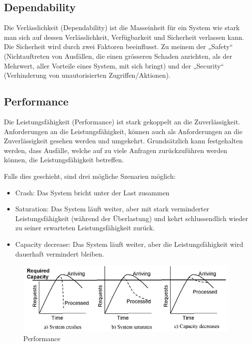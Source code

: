 \subsection{Dependability}

Die Verlässlichkeit (Dependability) ist die Masseinheit für ein System wie stark man sich auf dessen Verlässlichkeit, Verfügbarkeit und Sicherheit verlassen kann. Die Sicherheit wird durch zwei Faktoren beeinflusst. Zu meinem der „Safety“ (Nichtauftreten von Ausfällen, die einen grösseren Schaden anrichten, als der Mehrwert, aller Vorteile eines System, mit sich bringt) und der „Security“ (Verhinderung von unautorisierten Zugriffen/Aktionen).

\subsection{Performance}

Die Leistungsfähigkeit (Performance) ist stark gekoppelt an die Zuverlässigkeit. Anforderungen an die Leistungsfähigkeit, können auch als Anforderungen an die Zuverlässigkeit gesehen werden und umgekehrt. Grundsätzlich kann festgehalten werden, dass Ausfälle, welche auf zu viele Anfragen zurückzuführen werden können, die Leistungsfähigkeit betreffen.

Falls dies geschieht, sind drei mögliche Szenarien möglich:

\begin{itemize}
	\item Crash: Das System bricht unter der Last zusammen
	\item Saturation: Das System läuft weiter, aber mit stark verminderter Leistungsfähigkeit (während der Überlastung) und kehrt schlussendlich wieder zu seiner erwarteten Leistungsfähigkeit zurück.
	\item Capacity decrease: Das System läuft weiter, aber die Leistungsfähigkeit wird dauerhaft vermindert bleiben.
\end{itemize}

\begin{figure}[H]
	\centering
	\includegraphics[width=\textwidth]{content/faulttolerance/images/performance.jpg}
	\caption{Performance}
\end{figure}